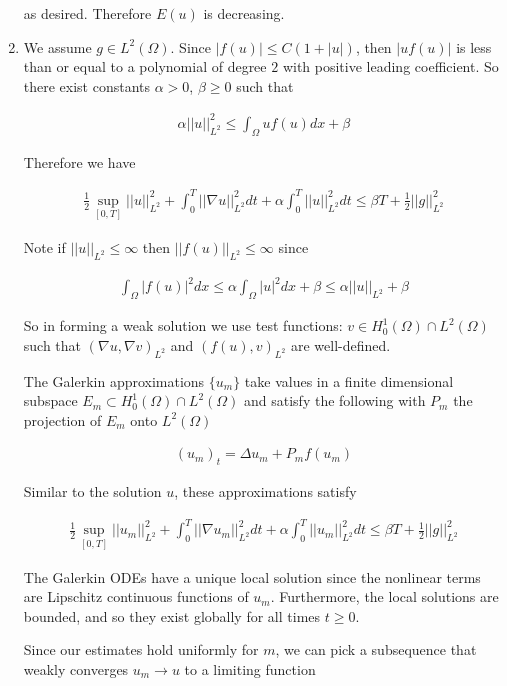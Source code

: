 \documentclass[12pt, letterpaper]{article}
\begin{document}
\begin{enumerate}
as desired. Therefore $E(u)$ is decreasing.

\item We assume $g\in L^2(\Omega)$. Since $|f(u)|\le C(1+|u|)$, then $|uf(u)|$ is less than or equal to a polynomial of degree $2$ with positive leading coefficient. So there exist constants $\alpha>0$, $\beta\ge0$ such that

\begin{align}
\alpha||u||^2_{L^2}\le\int_\Omega uf(u)dx + \beta
\end{align}

Therefore we have

\begin{align}
\frac{1}{2}\sup_{[0,T]}||u||^2_{L^2} + \int_0^T||\nabla u||^2_{L^2}dt +\alpha\int_0^T||u||_{L^2}^2dt \le\beta T+\frac{1}{2}||g||^2_{L^2}
\end{align}

Note if $||u||_{L^2}\le\infty$ then $||f(u)||_{L^2}\le\infty$ since

\begin{align}
\int_\Omega |f(u)|^2dx\le \alpha\int_\Omega|u|^2dx+\beta\le\alpha||u||_{L^2}+\beta
\end{align}

So in forming a weak solution we use test functions: $v\in H_0^1(\Omega)\cap L^2(\Omega)$ such that $(\nabla u, \nabla v)_{L^2}$ and $(f(u),v)_{L^2}$ are well-defined.

The Galerkin approximations $\{u_m\}$ take values in a finite dimensional subspace $E_m\subset H_0^1(\Omega)\cap L^2(\Omega)$ and satisfy the following with $P_m$ the projection of $E_m$ onto $L^2(\Omega)$

\begin{align}
(u_m)_t=\Delta u_m + P_m f(u_m)
\end{align}

Similar to the solution $u$, these approximations satisfy

\begin{align}
\frac{1}{2}\sup_{[0,T]}||u_m||^2_{L^2} + \int_0^T||\nabla u_m||^2_{L^2}dt +\alpha\int_0^T||u_m||_{L^2}^2dt \le\beta T+\frac{1}{2}||g||^2_{L^2}
\end{align}

The Galerkin ODEs have a unique local solution since the nonlinear terms are Lipschitz continuous functions of $u_m$. Furthermore, the local solutions are bounded, and so they exist globally for all times $t\ge0$.

Since our estimates hold uniformly for $m$, we can pick a subsequence that weakly converges $u_m\rightarrow u$ to a limiting function


\end{enumerate}
\end{document}
